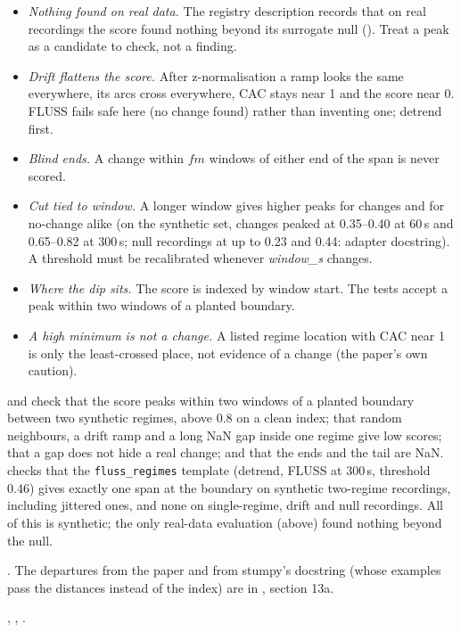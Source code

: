 \begin{itemize}
\item \emph{Nothing found on real data.} The registry description records that on real recordings
  the score found nothing beyond its surrogate null
  (). Treat a peak as a candidate to check,
  not a finding.
\item \emph{Drift flattens the score.} After z-normalisation a ramp looks the same everywhere, its
  arcs cross everywhere, CAC stays near 1 and the score near 0. FLUSS fails safe here (no change
  found) rather than inventing one; detrend first.
\item \emph{Blind ends.} A change within $fm$ windows of either end of the span is never scored.
\item \emph{Cut tied to window.} A longer window gives higher peaks for changes and for
  no-change alike (on the synthetic set, changes peaked at 0.35--0.40 at 60\,s and 0.65--0.82 at
  300\,s; null recordings at up to 0.23 and 0.44: adapter docstring). A threshold must be
  recalibrated whenever \emph{window\_s} changes.
\item \emph{Where the dip sits.} The score is indexed by window start.  The tests accept a peak within two windows of a planted boundary.
\item \emph{A high minimum is not a change.} A listed regime location with CAC near 1 is only the
  least-crossed place, not evidence of a change (the paper's own caution).
\end{itemize}

 and  check that the score peaks within
two windows of a planted boundary between two synthetic regimes, above 0.8 on a clean index; that
random neighbours, a drift ramp and a long NaN gap inside one regime give low scores; that a gap does
not hide a real change; and that the ends and the tail are NaN. 
checks that the \texttt{fluss\_regimes} template (detrend, FLUSS at 300\,s, threshold 0.46) gives
exactly one span at the boundary on synthetic two-regime recordings, including jittered ones, and
none on single-regime, drift and null recordings. All of this is synthetic; the only real-data
evaluation (above) found nothing beyond the null.

\citet{gharghabi2017matrix}. The departures from the paper and from stumpy's docstring (whose
examples pass the distances instead of the index) are in
, section 13a.

, ,
.
